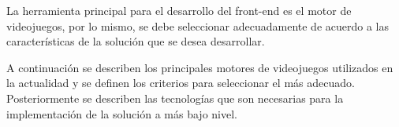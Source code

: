 La herramienta principal para el desarrollo del front-end es el motor de videojuegos, por lo 
mismo, se debe seleccionar adecuadamente de acuerdo a las características de la solución que 
se desea desarrollar.

A continuación se describen los principales motores de videojuegos utilizados en la actualidad y se 
definen los criterios para seleccionar el más adecuado. Posteriormente se describen las 
tecnologías que son necesarias para la implementación de la solución a más bajo nivel.




